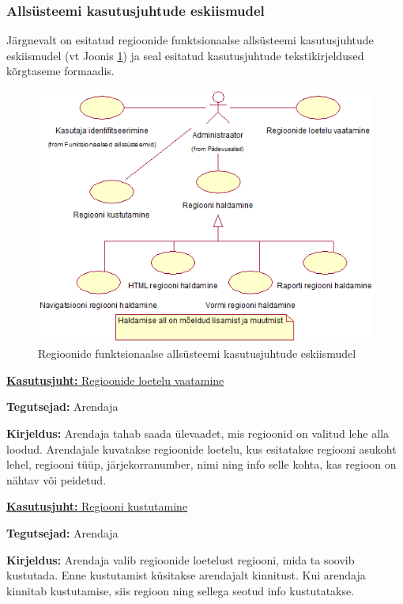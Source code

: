 \documentclass[a4paper,12pt]{article} %
\begin{document}
\subsubsection{Allsüsteemi kasutusjuhtude eskiismudel}
Järgnevalt on esitatud regioonide funktsionaalse allsüsteemi kasutusjuhtude eskiismudel (vt Joonis \ref{fig_regioonide_funktsionaalse_allsüsteemi_kasutusjuhtude_eskiismudel}) ja seal esitatud kasutusjuhtude tekstikirjeldused kõrgtaseme formaadis.
\begin{figure}[H]
\centering
\includegraphics[width=\textwidth]{./diagrams/regions-subsystem-use-case-digram.png}
\caption{Regioonide funktsionaalse allsüsteemi kasutusjuhtude eskiismudel}
\label{fig_regioonide_funktsionaalse_allsüsteemi_kasutusjuhtude_eskiismudel}
\end{figure}

\underline{\textbf{Kasutusjuht:} Regioonide loetelu vaatamine}
\par
\textbf{Tegutsejad:} Arendaja
\par
\textbf{Kirjeldus:} Arendaja tahab saada ülevaadet, mis regioonid on valitud lehe alla loodud. Arendajale kuvatakse regioonide loetelu, kus esitatakse regiooni asukoht lehel, regiooni tüüp, järjekorranumber, nimi ning info selle kohta, kas regioon on nähtav või peidetud.
\par

\underline{\textbf{Kasutusjuht:} Regiooni kustutamine}
\par
\textbf{Tegutsejad:} Arendaja
\par
\textbf{Kirjeldus:} Arendaja valib regioonide loetelust regiooni, mida ta soovib kustutada. Enne kustutamist küsitakse arendajalt kinnitust. Kui arendaja kinnitab kustutamise, siis regioon ning sellega seotud info kustutatakse.
\end{document}
